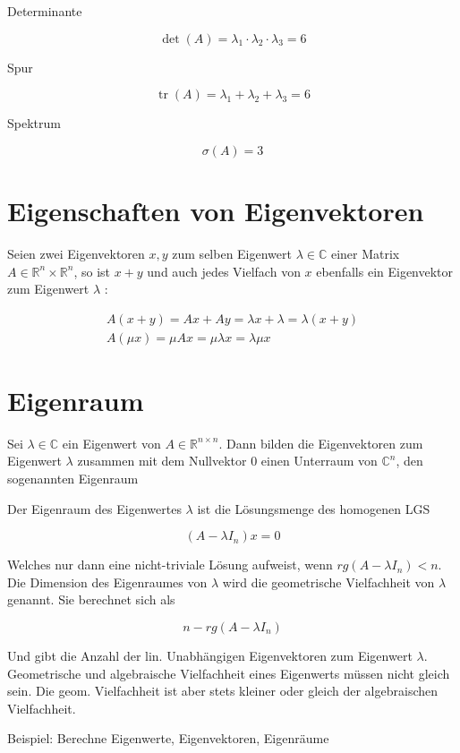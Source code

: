 \documentclass[10pt]{article}
\begin{document}
Determinante

$$
\operatorname{det}(A)=\lambda_{1} \cdot \lambda_{2} \cdot \lambda_{3}=6
$$

Spur

$$
\operatorname{tr}(A)=\lambda_{1}+\lambda_{2}+\lambda_{3}=6
$$

Spektrum

$$
\sigma(A)=3
$$

\section*{Eigenschaften von Eigenvektoren}
Seien zwei Eigenvektoren $x, y$ zum selben Eigenwert $\lambda \in \mathbb{C}$ einer Matrix $A \in \mathbb{R}^{n} \times \mathbb{R}^{n}$, so ist $x+y$ und auch jedes Vielfach von $x$ ebenfalls ein Eigenvektor zum Eigenwert $\lambda$ :

$$
\begin{gathered}
A(x+y)=A x+A y=\lambda x+\lambda=\lambda(x+y) \\
A(\mu x)=\mu A x=\mu \lambda x=\lambda \mu x
\end{gathered}
$$

\section*{Eigenraum}
Sei $\lambda \in \mathbb{C}$ ein Eigenwert von $A \in \mathbb{R}^{n \times n}$. Dann bilden die Eigenvektoren zum Eigenwert $\lambda$ zusammen mit dem Nullvektor 0 einen Unterraum von $\mathbb{C}^{n}$, den sogenannten Eigenraum

Der Eigenraum des Eigenwertes $\lambda$ ist die Lösungsmenge des homogenen LGS

$$
\left(A-\lambda I_{n}\right) x=0
$$

Welches nur dann eine nicht-triviale Lösung aufweist, wenn $r g\left(A-\lambda I_{n}\right)<n$.\\
Die Dimension des Eigenraumes von $\lambda$ wird die geometrische Vielfachheit von $\lambda$ genannt. Sie berechnet sich als

$$
n-r g\left(A-\lambda I_{n}\right)
$$

Und gibt die Anzahl der lin. Unabhängigen Eigenvektoren zum Eigenwert $\lambda$.\\
Geometrische und algebraische Vielfachheit eines Eigenwerts müssen nicht gleich sein. Die geom. Vielfachheit ist aber stets kleiner oder gleich der algebraischen Vielfachheit.

Beispiel: Berechne Eigenwerte, Eigenvektoren, Eigenräume
\end{document}
